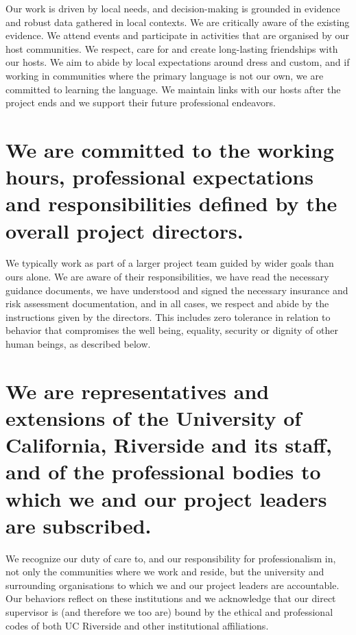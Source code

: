 \documentclass[
]{book}
\begin{document}
Our work is driven by local needs, and decision-making is grounded in evidence and robust data gathered in local contexts. We are critically aware of the existing evidence. We attend events and participate in activities that are organised by our host communities. We respect, care for and create long-lasting friendships with our hosts. We aim to abide by local expectations around dress and custom, and if working in communities where the primary language is not our own, we are committed to learning the language. We maintain links with our hosts after the project ends and we support their future professional endeavors.

\hypertarget{we-are-committed-to-the-working-hours-professional-expectations-and-responsibilities-defined-by-the-overall-project-directors.}{%
\section{We are committed to the working hours, professional expectations and responsibilities defined by the overall project directors.}\label{we-are-committed-to-the-working-hours-professional-expectations-and-responsibilities-defined-by-the-overall-project-directors.}}

We typically work as part of a larger project team guided by wider goals than ours alone. We are aware of their responsibilities, we have read the necessary guidance documents, we have understood and signed the necessary insurance and risk assessment documentation, and in all cases, we respect and abide by the instructions given by the directors. This includes zero tolerance in relation to behavior that compromises the well being, equality, security or dignity of other human beings, as described below.

\hypertarget{we-are-representatives-and-extensions-of-the-university-of-california-riverside-and-its-staff-and-of-the-professional-bodies-to-which-we-and-our-project-leaders-are-subscribed.}{%
\section{We are representatives and extensions of the University of California, Riverside and its staff, and of the professional bodies to which we and our project leaders are subscribed.}\label{we-are-representatives-and-extensions-of-the-university-of-california-riverside-and-its-staff-and-of-the-professional-bodies-to-which-we-and-our-project-leaders-are-subscribed.}}

We recognize our duty of care to, and our responsibility for professionalism in, not only the communities where we work and reside, but the university and surrounding organisations to which we and our project leaders are accountable. Our behaviors reflect on these institutions and we acknowledge that our direct supervisor is (and therefore we too are) bound by the ethical and professional codes of both UC Riverside and other institutional affiliations.
\end{document}
